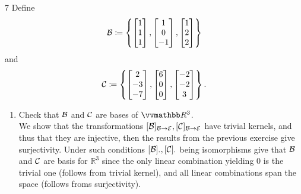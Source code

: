 \documentclass{exercises}
\begin{document}
\begin{exr}{}{7}
	Define
	\begin{equation*}
		\basis{B}\ceqq \left\{ \begin{bmatrix}1 \\ 1 \\ 1\end{bmatrix},\begin{bmatrix}1 \\ 0 \\ -1\end{bmatrix},\begin{bmatrix}1 \\ 2 \\ 2\end{bmatrix}\right\}
	\end{equation*}
	and
	\begin{equation*}
		\basis{C}\ceqq \left\{ \begin{bmatrix}2 \\ -3 \\ -7\end{bmatrix},\begin{bmatrix}6 \\ 0 \\ 0\end{bmatrix},\begin{bmatrix}-2 \\ -2 \\ 3\end{bmatrix}\right\} .
	\end{equation*}
	\begin{enumerate}
		\item Check that $\basis{B}$ and $\basis{C}$ are bases of $\R ^3$. \\


		We show that the transformations $[\scriptb]_{\scriptb \to \scripte}, [\scriptc]_{\scriptb \to \scripte}$ have trivial kernels, and thus that they are injective, then the results from the previous exercise give surjectivity. Under such conditions $[\scriptb]_\cdot, [\scriptc]_\cdot$ being isomorphisms give that $\scriptb$ and $\scriptc$ are basis for $\mathbb{R}^3$ since the only linear combination yielding $0$ is the trivial one (follows from trivial kernel), and all linear combinations span the space (follows froms surjectivity). \\


\end{enumerate}
\end{exr}
\end{document}
